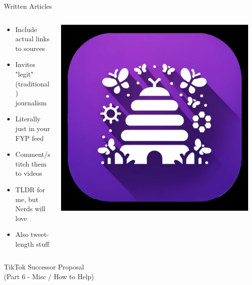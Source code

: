 \documentclass[aspectratio=169]{beamer}
\begin{document}
\begin{frame}{Written Articles}
\begin{columns}[T]
    \begin{column}[T]{0.5\textwidth}
        \begin{itemize}
            \item Include actual links to sources
            \item Invites "legit" (traditional) journalism
            \item Literally just in your FYP feed
            \item Comment/stitch them to videos
            \item TLDR for me, but Nerds will love
            \item Also tweet-length stuff
        \end{itemize}
    \end{column}
    \begin{column}{0.5\textwidth}
        \includegraphics[height=0.8\textheight]{imgs/app_icons/2.png}
    \end{column}
\end{columns}
\end{frame}

\begin{frame}
    \centering
    \Huge TikTok Successor Proposal \\
    \Huge (Part 6 - Misc / How to Help)
\end{frame}
\end{document}
